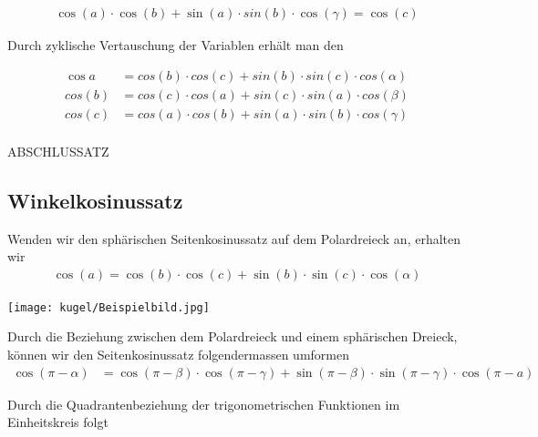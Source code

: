 \begin{refsection}
\begin{align*}
\cos(a) \cdot \cos(b) + \sin(a) \cdot sin(b) \cdot \cos(\gamma) = \cos(c)
\end{align*}

Durch zyklische Vertauschung der Variablen erhält man den 

\begin{satz}
\label{skript:kugel:satz:Seitenkosinussatz}
\end{satz}


\begin{align*}
{\cos a} &= {cos(b)} \cdot {cos(c)} + {sin(b)} \cdot {sin(c)} \cdot {cos(\alpha)}\\
{cos(b)} &= {cos(c)} \cdot {cos(a)} + {sin (c)} \cdot {sin(a)} \cdot {cos(\beta)}\\
{cos(c)} &= {cos(a)} \cdot {cos(b)} + {sin(a)} \cdot {sin(b)} \cdot {cos(\gamma)}\\
\end{align*}


ABSCHLUSSATZ

\subsection{Winkelkosinussatz}

Wenden wir den sphärischen Seitenkosinussatz auf dem Polardreieck an, erhalten wir
\begin{align*}
{\cos (a)} = {\cos (b)} \cdot {\cos (c)} + {\sin(b)} \cdot {\sin(c)} \cdot {\cos (\alpha)}
\end{align*}

\begin{center}
        \texttt{[image: kugel/Beispielbild.jpg]}
\end{center}

Durch die Beziehung zwischen dem Polardreieck und einem sphärischen Dreieck, können wir den Seitenkosinussatz folgendermassen umformen
\begin{align*}
{\cos (\pi-\alpha)} &= {\cos (\pi-\beta)} \cdot {\cos (\pi-\gamma)} + {\sin(\pi-\beta)} \cdot {\sin(\pi-\gamma)} \cdot {\cos (\pi-a)}
\end{align*}

Durch die Quadrantenbeziehung der trigonometrischen Funktionen im Einheitskreis folgt


\end{refsection}
